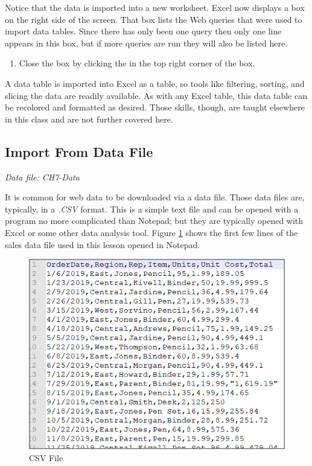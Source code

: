 Notice that the data is imported into a new worksheet. Excel now displays a  box on the right side of the screen. That box lists the Web queries that were used to import data tables. Since there has only been one query then only one line appears in this box, but if more queries are run they will also be listed here. 

\begin{enumerate}[resume]
	\item Close the  box by clicking the  in the top right corner of the box.
\end{enumerate}

A data table is imported into Excel as a table, so tools like filtering, sorting, and slicing the data are readily available. As with any Excel table, this data table can be recolored and formatted as desired. Those skills, though, are taught elsewhere in this class and are not further covered here.

\subsection{Import From Data File}

\textit{Data file: CH7-Data}

It is common for web data to be downloaded via a data file. Those data files are, typically, in a \textit{.CSV} format. This is a simple text file and can be opened with a program no more complicated than Notepad; but they are typically opened with Excel or some other data analysis tool. Figure \ref{07:fig05} shows the first few lines of the sales data file used in this lesson opened in Notepad.

\begin{figure}[H]
	\centering
	\includegraphics[width=\maxwidth{.95\linewidth}]{gfx/ch07_fig05}
	\caption{CSV File}
	\label{07:fig05}
\end{figure}

